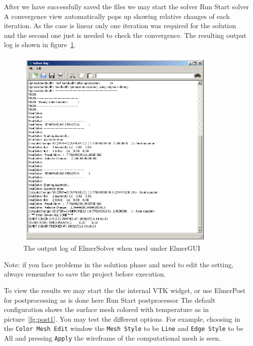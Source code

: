 After we have successfully saved the files we may start the solver
\ttbegin
Run
  Start solver
\ttend
A convergence view automatically pops up showing relative changes of each iteration.
As the case is linear only one iteration was required for the solution and the second one
just is needed to check the convergence. 
The resulting output log is shown in figure~\ref{fg:log1}.

\begin{figure}
\begin{center}
\includegraphics[width=100mm]{Tangle_com}
\caption{The output log of ElmerSolver when used under ElmerGUI}\label{fg:log1}
\end{center}
\end{figure}

Note: if you face problems in the solution phase and need to edit the setting, always remember to save
the project before execution.

To view the results we may start the the internal VTK widget, 
or use ElmerPost for postprocessing as is done
here
\ttbegin
Run
  Start postprocessor
\ttend
The default configuration shows the surface mesh colored with temperature as in picture~\ref{fg:post1}. You may test 
the different options. For example, choosing in the \texttt{Color Mesh Edit} window the 
\texttt{Mesh Style} to be \texttt{Line} and
\texttt{Edge Style} to be {All} and pressing \texttt{Apply} the wireframe of the computational 
mesh is seen. 


